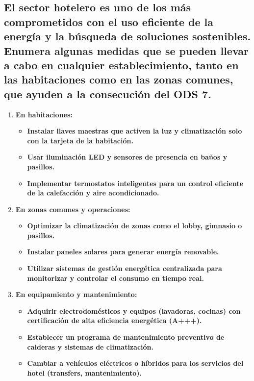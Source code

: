 
\fsection{\boldit{\textcolor{waveBlue2}{Actividad.}}} 
\subsection*{El sector hotelero es uno de los más comprometidos con el uso eficiente de la energía y la búsqueda de soluciones sostenibles. Enumera algunas medidas que se pueden llevar a cabo en cualquier establecimiento, tanto en las habitaciones como en las zonas comunes, que ayuden a la consecución del ODS 7.}

\begin{solution}
	\begin{enumerate}	
	    \item \textbf{En habitaciones:}
		\begin{itemize}

		    \item \textbf{Instalar llaves maestras que activen la luz y climatización solo con la tarjeta de la habitación.}

		    \item \textbf{Usar iluminación LED y sensores de presencia en baños y pasillos.}

		    \item \textbf{Implementar termostatos inteligentes para un control eficiente de la calefacción y aire acondicionado.}

		\end{itemize}

	    \item \textbf{En zonas comunes y operaciones:}
		\begin{itemize}

		    \item \textbf{Optimizar la climatización de zonas como el lobby, gimnasio o pasillos.}

		    \item \textbf{Instalar paneles solares para generar energía renovable.}

		    \item \textbf{Utilizar sistemas de gestión energética centralizada para monitorizar y controlar el consumo en tiempo real.}

		\end{itemize}

	    \item \textbf{En equipamiento y mantenimiento:}

		\begin{itemize}
		    \item \textbf{Adquirir electrodomésticos y equipos (lavadoras, cocinas) con certificación de alta eficiencia energética (A+++).}
		    \item \textbf{Establecer un programa de mantenimiento preventivo de calderas y sistemas de climatización.}
		    \item \textbf{Cambiar a vehículos eléctricos o híbridos para los servicios del hotel (transfers, mantenimiento).}
		\end{itemize}

	\end{enumerate}






\end{solution}
